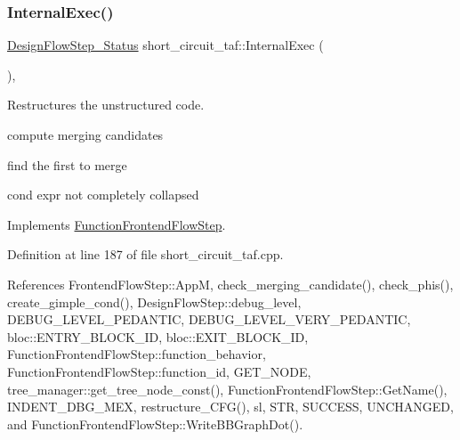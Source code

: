 \subsubsection{\texorpdfstring{Internal\+Exec()}{InternalExec()}}
{\footnotesize\ttfamily \hyperlink{design__flow__step_8hpp_afb1f0d73069c26076b8d31dbc8ebecdf}{Design\+Flow\+Step\+\_\+\+Status} short\+\_\+circuit\+\_\+taf\+::\+Internal\+Exec (\begin{DoxyParamCaption}{ }\end{DoxyParamCaption})\hspace{0.3cm}{\ttfamily [override]}, {\ttfamily [virtual]}}



Restructures the unstructured code. 

compute merging candidates

find the first to merge

cond expr not completely collapsed 

Implements \hyperlink{classFunctionFrontendFlowStep_a00612f7fb9eabbbc8ee7e39d34e5ac68}{Function\+Frontend\+Flow\+Step}.



Definition at line 187 of file short\+\_\+circuit\+\_\+taf.\+cpp.



References Frontend\+Flow\+Step\+::\+AppM, check\+\_\+merging\+\_\+candidate(), check\+\_\+phis(), create\+\_\+gimple\+\_\+cond(), Design\+Flow\+Step\+::debug\+\_\+level, D\+E\+B\+U\+G\+\_\+\+L\+E\+V\+E\+L\+\_\+\+P\+E\+D\+A\+N\+T\+IC, D\+E\+B\+U\+G\+\_\+\+L\+E\+V\+E\+L\+\_\+\+V\+E\+R\+Y\+\_\+\+P\+E\+D\+A\+N\+T\+IC, bloc\+::\+E\+N\+T\+R\+Y\+\_\+\+B\+L\+O\+C\+K\+\_\+\+ID, bloc\+::\+E\+X\+I\+T\+\_\+\+B\+L\+O\+C\+K\+\_\+\+ID, Function\+Frontend\+Flow\+Step\+::function\+\_\+behavior, Function\+Frontend\+Flow\+Step\+::function\+\_\+id, G\+E\+T\+\_\+\+N\+O\+DE, tree\+\_\+manager\+::get\+\_\+tree\+\_\+node\+\_\+const(), Function\+Frontend\+Flow\+Step\+::\+Get\+Name(), I\+N\+D\+E\+N\+T\+\_\+\+D\+B\+G\+\_\+\+M\+EX, restructure\+\_\+\+C\+F\+G(), sl, S\+TR, S\+U\+C\+C\+E\+SS, U\+N\+C\+H\+A\+N\+G\+ED, and Function\+Frontend\+Flow\+Step\+::\+Write\+B\+B\+Graph\+Dot().

